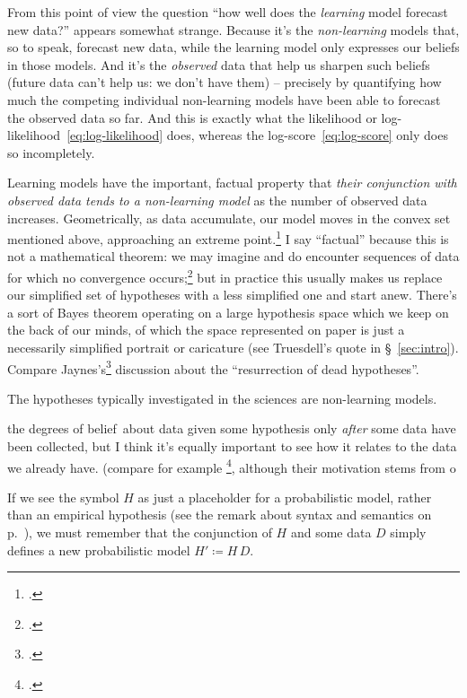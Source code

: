 \documentclass[\ifafour a4paper,12pt,\else a5paper,10pt,\fi%
onecolumn,oneside,article,%
british%
]{memoir}
\theoremstyle{remark}
\theoremstyle{innote}
\newcommand*{\citep}{\footcites}
\newcommand*{\defd}{\coloneqq}
\renewcommand*{\|}[1][]{\nonscript\,#1\vert\nonscript\;\mathopen{}}
\newcommand*{\sect}{\S}%
\newcommand*{\chap}{ch.}%
\newcommand*{\dobs}{degrees of belief}
\begin{document}
From this point of view the question \enquote{how well does the
  \emph{learning} model forecast new data?} appears somewhat strange.
Because it's the \emph{non-learning} models that, so to speak, forecast new
data, while the learning model only expresses our beliefs in those models.
And it's the \emph{observed} data that help us sharpen such beliefs (future
data can't help us: we don't have them) -- precisely by quantifying how
much the competing individual non-learning models have been able to
forecast the observed data so far. And this is exactly what the likelihood or
log-likelihood~\eqref{eq:log-likelihood} does, whereas the
log-score~\eqref{eq:log-score} only does so incompletely.



Learning models have the important, factual
property that \emph{their conjunction with observed data tends to a
  non-learning model} as the number of observed data increases.
Geometrically, as data accumulate, our model moves in the convex set
mentioned above, approaching an extreme point.\citep[compare Hjort
in][p.~50]{barronetal1986}[\chap~3]{hjort1986} I say \enquote{factual}
because this is not a mathematical theorem: we may imagine and do encounter
sequences of data for which no convergence occurs;\citep[see
\eg][]{bruno1964,berk1966,berk1970}[also][\sect~3]{diaconis1988} but in
practice this usually makes us replace our simplified set of hypotheses
with a less simplified one and start anew. There's a sort of Bayes theorem
operating on a large hypothesis space which we keep on the back of our
minds, of which the space represented on paper is just a necessarily
simplified portrait or caricature (see Truesdell's quote in
\sect~\ref{sec:intro}). Compare
Jaynes's\citep[\sect~4.4.1]{jaynes1994_r2003} discussion about the
\enquote{resurrection of dead hypotheses}.

The hypotheses typically investigated in the sciences are non-learning models.


the \dobs\ about data given some
hypothesis only \emph{after} some data have been collected, but I think
it's equally important to see how it relates to the data we already have.
(compare for example \citep{ohagan1995,bergeretal1996,bergeretal1998},
although their motivation stems from o

If we see the symbol $H$ as just a placeholder for a probabilistic model,
rather than an empirical hypothesis (see the remark about syntax and
semantics on p.~\pageref{note:syntax}), we must remember that the
conjunction of $H$ and some data $D$ simply defines a new probabilistic
model $H' \defd H \, D$.
\end{document}
